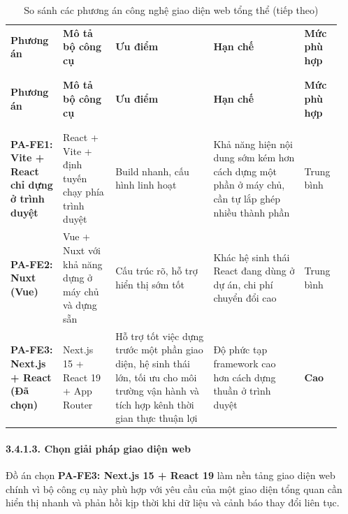 \documentclass[a4paper]{extarticle}
\newcommand{\thesissettableid}[2]{%
  \renewcommand{\thetable}{#1}%
  \renewcommand{\theHtable}{#2}%
}
\begin{document}
{\thesissettableid{3.23A}{tab-ch3-so-sanh-cac-phuong-an-cong-nghe-frontend-tong-the}
\def\LTcaptype{table}
\begin{longtable}{|L{0.154\linewidth}|L{0.157\linewidth}|L{0.280\linewidth}|L{0.269\linewidth}|L{0.085\linewidth}|}
\caption{So sánh các phương án công nghệ giao diện web tổng thể}\label{tab:ch3-so-sanh-cac-phuong-an-cong-nghe-frontend-tong-the}\\
\hline \textbf{Phương án} & \textbf{Mô tả bộ công cụ} & \textbf{Ưu điểm} & \textbf{Hạn chế} & \textbf{Mức phù hợp} \\
\\\hline
\endfirsthead
\caption[]{So sánh các phương án công nghệ giao diện web tổng thể (tiếp theo)}\\
\hline \textbf{Phương án} & \textbf{Mô tả bộ công cụ} & \textbf{Ưu điểm} & \textbf{Hạn chế} & \textbf{Mức phù hợp} \\
\\\hline
\endhead
\\\hline
\endfoot
\endlastfoot
\textbf{PA-FE1: Vite + React chỉ dựng ở trình duyệt} & React + Vite +
định tuyến chạy phía trình duyệt & Build nhanh, cấu hình linh hoạt &
Khả năng hiện nội dung sớm kém hơn cách dựng một phần ở máy chủ, cần tự
lắp ghép nhiều thành phần & Trung bình \\\hline
\textbf{PA-FE2: Nuxt (Vue)} & Vue + Nuxt với khả năng dựng ở máy chủ và
dựng sẵn & Cấu trúc rõ, hỗ trợ hiển thị sớm tốt & Khác hệ sinh thái
React đang dùng ở dự án, chi phí chuyển đổi cao & Trung bình \\\hline
\textbf{PA-FE3: Next.js + React (Đã chọn)} & Next.js 15 + React 19 + App
Router & Hỗ trợ tốt việc dựng trước một phần giao diện, hệ sinh thái lớn,
tối ưu cho môi trường vận hành và tích hợp kênh thời gian thực thuận lợi
& Độ phức tạp framework cao hơn cách dựng thuần ở trình duyệt &
\textbf{Cao} \\\hline
\end{longtable}
}


\paragraph{3.4.1.3. Chọn giải pháp
giao diện web}\label{3143-chux1ecdn-giux1ea3i-phuxe1p-frontend}

Đồ án chọn \textbf{PA-FE3: Next.js 15 + React 19} làm nền tảng giao diện
web chính vì bộ công cụ này phù hợp với yêu cầu của một giao diện tổng
quan cần hiển thị nhanh và phản hồi kịp thời khi dữ liệu và cảnh báo thay
đổi liên tục.
\end{document}
